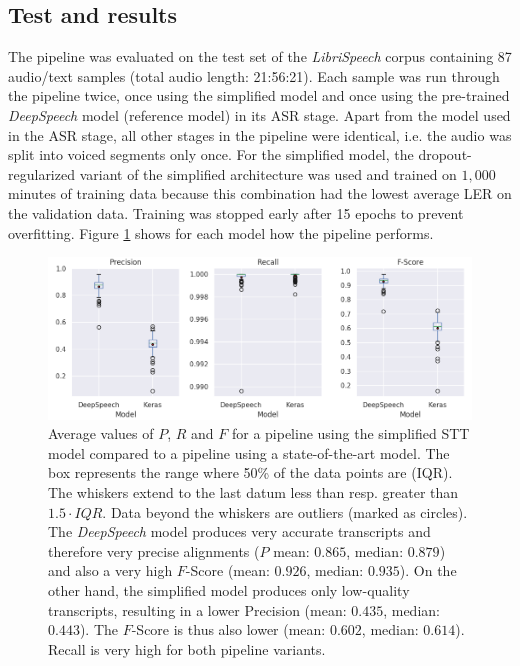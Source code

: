 \subsection{Test and results}

The pipeline was evaluated on the test set of the \textit{LibriSpeech} corpus containing 87 audio/text samples (total audio length: 21:56:21). Each sample was run through the pipeline twice, once using the simplified model and once using the pre-trained \textit{DeepSpeech} model (reference model) in its \ac{ASR} stage. Apart from the model used in the \ac{ASR} stage, all other stages in the pipeline were identical, i.e. the audio was split into voiced segments only once. For the simplified model, the dropout-regularized variant of the simplified architecture was used and trained on $1,000$ minutes of training data because this combination had the lowest average \ac{LER} on the validation data. Training was stopped early after 15 epochs to prevent overfitting. Figure \ref{pipeline_boxplot_ls_en} shows for each model how the pipeline performs. 

\begin{figure}[h!]
	\includegraphics[width=\linewidth]{./img/boxplot_ls.png}
	\caption{Average values of $P$, $R$ and $F$ for a pipeline using the simplified \ac{STT} model compared to a pipeline using a state-of-the-art model. The box represents the range where 50\% of the data points are (\ac{IQR}). The whiskers extend to the last datum less than resp. greater than $1.5 \cdot IQR$. Data beyond the whiskers are outliers (marked as circles). The \textit{DeepSpeech} model produces very accurate transcripts and therefore very precise alignments ($P$ mean: $0.865$, median: $0.879$) and also a very high $F$-Score (mean: $0.926$, median: $0.935$). On the other hand, the simplified model produces only low-quality transcripts, resulting in a lower Precision (mean: $0.435$, median: $0.443$). The $F$-Score is thus also lower (mean: $0.602$, median: $0.614$). Recall is very high for both pipeline variants.}
	\label{pipeline_boxplot_ls_en}
\end{figure}

